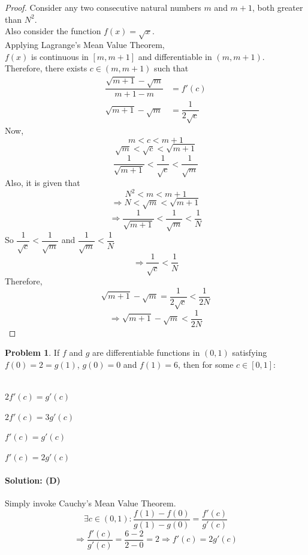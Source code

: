 \documentclass[14]{article}
\theoremstyle{definition}
\newtheorem{prob}{Problem}
\theoremstyle{case}
\begin{document}
\begin{proof}
Consider any two consecutive natural numbers $m$ and $m + 1$, both greater than $N^2$.\\
Also consider the function $f(x) = \sqrt{x}$.\\
Applying Lagrange's Mean Value Theorem,\\
$f(x)$ is continuous in $[m, m + 1]$ and differentiable in $(m, m + 1)$.\\
Therefore, there exists $c \in (m, m+1)$ such that
\begin{align*}
\dfrac{\sqrt{m + 1} - \sqrt{m}}{m + 1 - m} &= f'(c)\\
\sqrt{m + 1} - \sqrt{m} &= \dfrac{1}{2\sqrt{c}}
\end{align*}
Now,
\[m < c < m + 1\]
\[\sqrt{m} < \sqrt{c} < \sqrt{m + 1}\]
\[\dfrac1{\sqrt{m + 1}} < \dfrac{1}{\sqrt{c}} < \dfrac1{\sqrt{m}}\]
Also, it is given that
\[N^2 < m < m + 1\]
\[\Rightarrow N < \sqrt{m} < \sqrt{m + 1}\]
\[\Rightarrow\dfrac1{\sqrt{m + 1}} < \dfrac1{\sqrt{m}} < \dfrac{1}{N}\]
So $\dfrac1{\sqrt{c}} < \dfrac1{\sqrt{m}}$ and $\dfrac{1}{\sqrt{m}} < \dfrac1{N}$
\[\Rightarrow \dfrac1{\sqrt{c}} < \dfrac1{N}\]
Therefore,
\[\sqrt{m + 1} - \sqrt{m} = \dfrac{1}{2\sqrt{c}} < \dfrac{1}{2N}\]
\[\Rightarrow\sqrt{m + 1} - \sqrt{m} < \dfrac{1}{2N}\]
\end{proof}
\begin{prob}
If $f$ and $g$ are differentiable functions in $(0, 1)$ satisfying $f(0) = 2 = g(1)$, $g(0) = 0$ and $f(1) = 6$, then for some $c \in [0, 1]$:\\\\
\begin{enumerate*}[label=(\Alph*)]
\item $2 f'(c) = g'(c)$\\
\item $2 f'(c) = 3g'(c)$\\
\item $f'(c) = g'(c)$\\
\item $f'(c) = 2 g'(c)$
\end{enumerate*}
\end{prob}
\paragraph{Solution: (D)}
Simply invoke Cauchy's Mean Value Theorem.\\
\[\exists c \in (0, 1) : \dfrac{f(1) - f(0)}{g(1) - g(0)} = \dfrac{f'(c)}{g'(c)}\]
\[\Rightarrow \dfrac{f'(c)}{g'(c)} = \dfrac{6 - 2}{2-0} = 2 \Rightarrow f'(c) = 2 g'(c)\]
\pagebreak
\end{document}
